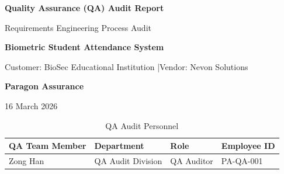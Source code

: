 \documentclass[11pt,a4paper]{article}
\renewcommand{\headrulewidth}{0.4pt}
\begin{document}
\thispagestyle{empty}
\fancyhf{}
\renewcommand{\headrulewidth}{0pt}


\begin{center}

\LARGE\textbf{Quality Assurance (QA) Audit Report}

\vspace{0.4cm}
\large Requirements Engineering Process Audit

\large \textbf{Biometric Student Attendance System}

\vspace{0.2cm}
\normalsize Customer: BioSec Educational Institution \quad|\quad Vendor: Nevon Solutions

\vspace{0.8cm}

\textbf{\Large Paragon Assurance}

\vspace{0.3cm}
\normalsize 16 March 2026

\end{center}

\vspace{0.5cm}

\begin{table}[H]
\centering
\small
\renewcommand{\arraystretch}{2.0}
\begin{tabular}{|m{}|m{}|m{}|m{}|}
\hline
\rowcolor{tableheader}
\textbf{QA Team Member} & \textbf{Department} & \textbf{Role} & \textbf{Employee ID} \\
\hline
Zong Han & QA Audit Division & QA Auditor & PA-QA-001 \\
\hline
\end{tabular}
\caption{QA Audit Personnel}
\label{tab:qa-team}
\end{table}

\restoregeometry
\newpage

\renewcommand{\contentsname}{Table of Contents}
\thispagestyle{empty}

\hypersetup{linkcolor=black}
\tableofcontents
\newpage
\hypersetup{linkcolor=blue}

\noindent{}
\end{document}
